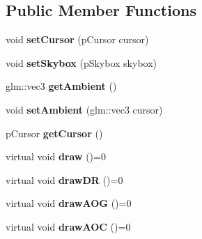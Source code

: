 \subsection*{Public Member Functions}
\begin{DoxyCompactItemize}
\item 
\hypertarget{classfillwave_1_1models_1_1Scene_ae16d187dc940a6b7ec2177af3b98c193}{}void {\bfseries set\+Cursor} (p\+Cursor cursor)\label{classfillwave_1_1models_1_1Scene_ae16d187dc940a6b7ec2177af3b98c193}

\item 
\hypertarget{classfillwave_1_1models_1_1Scene_ad6ba02096d6276fe9a9711c92e744427}{}void {\bfseries set\+Skybox} (p\+Skybox skybox)\label{classfillwave_1_1models_1_1Scene_ad6ba02096d6276fe9a9711c92e744427}

\item 
\hypertarget{classfillwave_1_1models_1_1Scene_aa6cd129a95fdca19aeffde9e5e6e750e}{}glm\+::vec3 {\bfseries get\+Ambient} ()\label{classfillwave_1_1models_1_1Scene_aa6cd129a95fdca19aeffde9e5e6e750e}

\item 
\hypertarget{classfillwave_1_1models_1_1Scene_aba64ca3ac4c1e98c96509ea3829bde12}{}void {\bfseries set\+Ambient} (glm\+::vec3 cursor)\label{classfillwave_1_1models_1_1Scene_aba64ca3ac4c1e98c96509ea3829bde12}

\item 
\hypertarget{classfillwave_1_1models_1_1Scene_ab6475833469fb97d1a59b00af8a9398f}{}p\+Cursor {\bfseries get\+Cursor} ()\label{classfillwave_1_1models_1_1Scene_ab6475833469fb97d1a59b00af8a9398f}

\item 
\hypertarget{classfillwave_1_1models_1_1Scene_a89dc9b527ba14c489f3369ba0e35531c}{}virtual void {\bfseries draw} ()=0\label{classfillwave_1_1models_1_1Scene_a89dc9b527ba14c489f3369ba0e35531c}

\item 
\hypertarget{classfillwave_1_1models_1_1Scene_abe6868684855e4e9cbfd6b8c557feee3}{}virtual void {\bfseries draw\+D\+R} ()=0\label{classfillwave_1_1models_1_1Scene_abe6868684855e4e9cbfd6b8c557feee3}

\item 
\hypertarget{classfillwave_1_1models_1_1Scene_a3943d07994ecc2d539b446427cf6a59c}{}virtual void {\bfseries draw\+A\+O\+G} ()=0\label{classfillwave_1_1models_1_1Scene_a3943d07994ecc2d539b446427cf6a59c}

\item 
\hypertarget{classfillwave_1_1models_1_1Scene_aa02b024ac6909ec4cd0515986378715e}{}virtual void {\bfseries draw\+A\+O\+C} ()=0\label{classfillwave_1_1models_1_1Scene_aa02b024ac6909ec4cd0515986378715e}


\end{DoxyCompactItemize}
